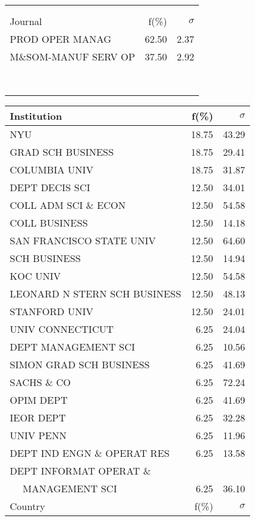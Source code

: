 \documentclass[a4paper,11pt]{report}
\begin{document}
\begin{landscape}
\begin{table}[!ht]
{\begin{tabular}{|l r  r|}
 &  & \\
 &  & \\
\hline
\hline
Journal & f(\%) & $\sigma$\\
\hline
PROD OPER MANAG & 62.50 & 2.37\\
M\&SOM-MANUF SERV OP & 37.50 & 2.92\\
 &  & \\
 &  & \\
 &  & \\
 &  & \\
 &  & \\
 &  & \\
 &  & \\
 &  & \\
\hline
\end{tabular}
}
{\scriptsize\begin{tabular}{|l r r|}
\hline
Institution & f(\%) & $\sigma$\\
\hline
NYU & 18.75 & 43.29\\
GRAD SCH BUSINESS & 18.75 & 29.41\\
COLUMBIA UNIV & 18.75 & 31.87\\
DEPT DECIS SCI & 12.50 & 34.01\\
COLL ADM SCI \& ECON & 12.50 & 54.58\\
COLL BUSINESS & 12.50 & 14.18\\
SAN FRANCISCO STATE UNIV & 12.50 & 64.60\\
SCH BUSINESS & 12.50 & 14.94\\
KOC UNIV & 12.50 & 54.58\\
LEONARD N STERN SCH BUSINESS & 12.50 & 48.13\\
STANFORD UNIV & 12.50 & 24.01\\
UNIV CONNECTICUT & 6.25 & 24.04\\
DEPT MANAGEMENT SCI & 6.25 & 10.56\\
SIMON GRAD SCH BUSINESS & 6.25 & 41.69\\
SACHS \& CO & 6.25 & 72.24\\
OPIM DEPT & 6.25 & 41.69\\
IEOR DEPT & 6.25 & 32.28\\
UNIV PENN & 6.25 & 11.96\\
DEPT IND ENGN \& OPERAT RES & 6.25 & 13.58\\
DEPT INFORMAT OPERAT \& &  & \\
$\quad$ MANAGEMENT SCI & 6.25 & 36.10\\
\hline
\hline
Country & f(\%) & $\sigma$\\
\hline

\end{tabular}}
\end{table}
\end{landscape}
\end{document}
